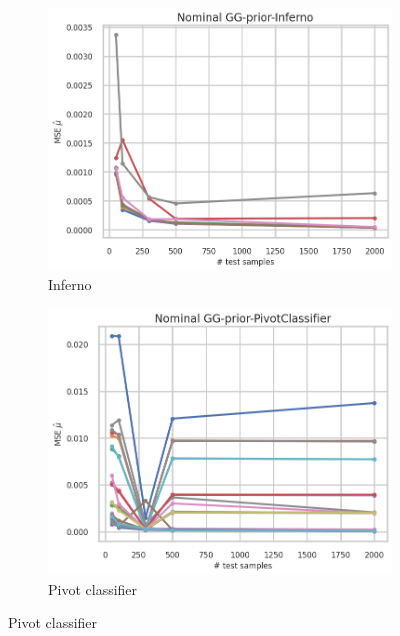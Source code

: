 \begin{figure}[ht!]
  \begin{subfigure}[t]{0.49\linewidth}
    \includegraphics[width=\linewidth]{COMPARE/GG-prior/Inferno/profusion_nominal_n_samples_mse.png}
    \caption{Inferno}
  \end{subfigure}%
  \hfill
  \begin{subfigure}[t]{0.49\linewidth}
    \includegraphics[width=\linewidth]{COMPARE/GG-prior/PivotClassifier/profusion_nominal_n_samples_mse.png}
    \caption{Pivot classifier}
  \end{subfigure}


\end{figure}
